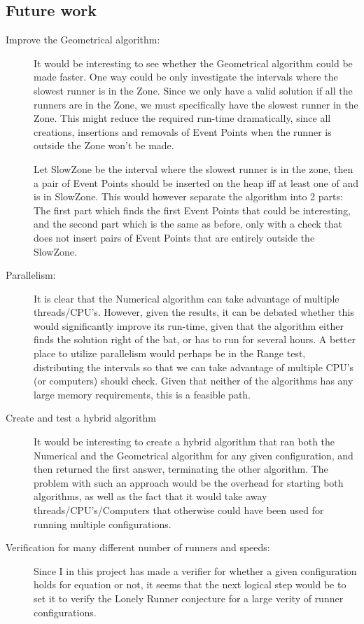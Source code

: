 \subsection{Future work}
\begin{description}
\item[Improve the Geometrical algorithm:] It would be interesting to see whether the Geometrical algorithm could be made faster. One way could be only investigate the intervals where the slowest runner is in the Zone. Since we only have a valid solution if all the runners are in the Zone, we must specifically have the slowest runner in the Zone. This might reduce the required run-time dramatically, since all creations, insertions and removals of Event Points when the runner is outside the Zone won't be made. 

Let SlowZone be the interval where the slowest runner is in the zone, then a pair of Event Points should be inserted on the heap iff at least one of \comStart and \comFin is in SlowZone. This would however separate the algorithm into 2 parts: The first part which finds the first Event Points that could be interesting, and the second part which is the same as before, only with a check that does not insert pairs of Event Points that are entirely outside the SlowZone.

\item[Parallelism:] It is clear that the Numerical algorithm can take advantage of multiple threads/CPU's. However, given the results, it can be debated whether this would significantly improve its run-time, given that the algorithm either finds the solution right of the bat, or has to run for several hours. A better place to utilize parallelism would perhaps be in the Range test, distributing the intervals so that we can take advantage of multiple CPU's (or computers) should check. Given that neither of the algorithms has any large memory requirements, this is a feasible path.

\item[Create and test a hybrid algorithm] It would be interesting to create a hybrid algorithm that ran both the Numerical and the Geometrical algorithm for any given configuration, and then returned the first answer, terminating the other algorithm. The problem with such an approach would be the overhead for starting both algorithms, as well as the fact that it would take away threads/CPU's/Computers that otherwise could have been used for running multiple configurations. 

\item[Verification for many different number of runners and speeds:] Since I in this project has made a verifier for whether a given configuration holds for equation  or not, it seems that the next logical step would be to set it to verify the Lonely Runner conjecture for a large verity of runner configurations. 


\end{description}
